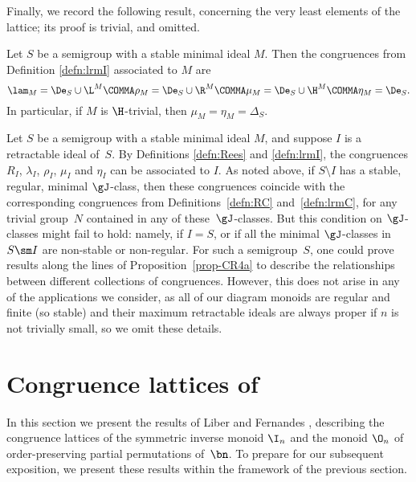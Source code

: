 Finally, we record the following result, concerning the very least elements of
the lattice; its proof is trivial, and omitted.

\begin{proposition}
\label{prop-CR5}
Let $S$ be a semigroup with a stable minimal ideal $M$.  Then the congruences from Definition \ref{defn:lrmI} associated to $M$ are
\[
\lam_M = \De_S\cup {\L^M} \COMMA
\rho_M = \De_S\cup {\R^M} \COMMA
\mu_M = \De_S\cup {\H^M} \COMMA
\eta_M = \De_S.
\]
  In particular, if $M$ is $\H$-trivial, then $\mu_M=\eta_M=\Delta_S$. 
  \epfres
\end{proposition}

\begin{rem}
Let $S$ be a semigroup with a stable minimal ideal $M$, and suppose $I$ is a retractable ideal of~$S$.  By Definitions \ref{defn:Rees} and \ref{defn:lrmI}, the congruences $R_I$, $\lambda_I$, $\rho_I$, $\mu_I$ and $\eta_I$ can be associated to $I$.  As noted above, if $S\setminus I$ has a stable, regular, minimal $\gJ$-class, then these congruences coincide with the corresponding congruences from Definitions~\ref{defn:RC} and~\ref{defn:lrmC}, for any trivial group~$N$ contained in any of these~$\gJ$-classes.  But this condition on $\gJ$-classes might fail to hold: namely, if $I=S$, or if all the minimal $\gJ$-classes in~$S\sm I$ are non-stable or non-regular.  For such a semigroup~$S$, one could prove results along the lines of Proposition~\ref{prop-CR4a} to describe the relationships between different collections of congruences.  However, this does not arise in any of the applications we consider, as all of our diagram monoids are regular and finite (so stable) and their maximum retractable ideals are always proper if $n$ is not trivially small, so we omit these details. 
\end{rem}

\section{Congruence lattices of }
\label{sec:SnInOn}

In this section we present the results of Liber \cite{Liber1953} and Fernandes
\cite{Fernandes2001}, describing the congruence lattices of the symmetric
inverse monoid $\I_n$ and the monoid $\O_n$ of order-preserving
partial permutations of~$\bn$.  To prepare for our subsequent exposition, we
present these results within the framework of the previous section.

